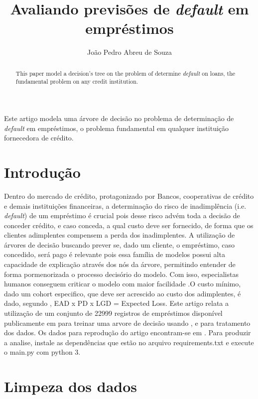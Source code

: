 \documentclass[12pt]{article}
\title{Avaliando previsões de \textit{default} em empréstimos}
\author{João Pedro Abreu de Souza\inst{1}}
\begin{document}
 

\maketitle

\begin{abstract}
  This paper model a decision's tree on the problem of determine \textit{default} on loans, the fundamental problem on any credit institution.
\end{abstract}
     
\begin{resumo} 
  Este artigo modela uma árvore de decisão no problema de determinação de \textit{default} em empréstimos, o problema fundamental em qualquer instituição fornecedora de crédito.
  
\end{resumo}


\section{Introdução}

Dentro do mercado de crédito, protagonizado por Bancos, cooperativas de crédito e demais instituições financeiras, a determinação do risco de inadimplência (i.e. \textit{default}) de um empréstimo é crucial pois desse risco advém toda a decisão de conceder crédito, e caso conceda, a qual custo deve ser fornecido, de forma que os clientes adimplentes compensem a perda dos inadimplentes. A utilização de árvores de decisão buscando prever se, dado um cliente, o empréstimo, caso concedido, será pago é relevante pois essa família de modelos possui alta capacidade de explicação através dos nós da árvore, permitindo entender de forma pormenorizada o processo decisório do modelo. Com isso, especialistas humanos conseguem criticar o modelo com maior facilidade .O custo mínimo, dado um cohort especifico, que deve ser acrescido ao custo dos adimplentes, é dado, segundo \cite{investopedia}, EAD x PD x LGD = Expected Loss. Este artigo relata a utilização de um conjunto de 22999 registros de empréstimos disponível publicamente em \cite{kaggle} para treinar uma arvore de decisão usando \cite{scikit}, \cite{pandas} e \cite{numpy} para tratamento dos dados. Os dados para reprodução do artigo encontram-se em \cite{repositorio}. Para produzir a analise, instale as dependências que estão no arquivo requirements.txt e execute o main.py com python 3.

\section{Limpeza dos dados} \label{sec:firstpage}
\end{document}
